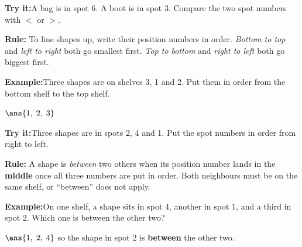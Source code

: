 \documentclass[12pt]{article}
\begin{document}
\begin{tryitbox}
\textbf{Try it:}\quad A bag is in spot 6. A boot is in spot 3. Compare the two
spot numbers with $<$ or $>$.\\[2pt]
\end{tryitbox}


\begin{formulabox}
\textbf{Rule:} To line shapes up, write their position numbers in order.
\emph{Bottom to top} and \emph{left to right} both go smallest first.
\emph{Top to bottom} and \emph{right to left} both go biggest first.
\end{formulabox}

\begin{examplebox}
\textbf{Example:}\quad Three shapes are on shelves 3, 1 and 2. Put them in
order from the bottom shelf to the top shelf.

$\ans{1, \; 2, \; 3}$
\end{examplebox}

\begin{tryitbox}
\textbf{Try it:}\quad Three shapes are in spots 2, 4 and 1. Put the spot numbers
in order from right to left.\\[2pt]
\end{tryitbox}


\begin{formulabox}
\textbf{Rule:} A shape is \emph{between} two others when its position number
lands in the \textbf{middle} once all three numbers are put in order. Both
neighbours must be on the same shelf, or ``between'' does not apply.
\end{formulabox}

\begin{examplebox}
\textbf{Example:}\quad On one shelf, a shape sits in spot 4, another in spot 1,
and a third in spot 2. Which one is between the other two?

$\ans{1, \; 2, \; 4}$ \quad so the shape in spot 2 is \textbf{between} the
other two.
\end{examplebox}
\end{document}
